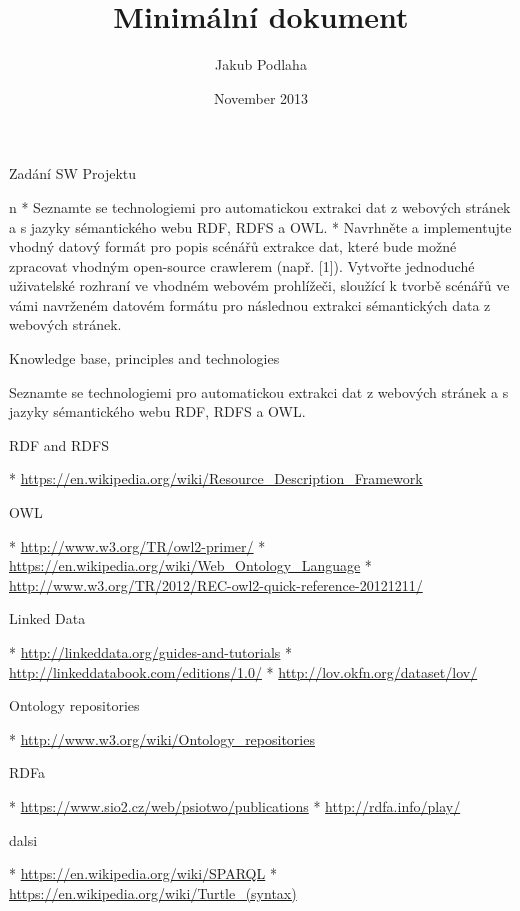 
\worktype [M/CZ]
\title {Minimální dokument}
\author {Jakub Podlaha}
\date {November 2013}
\makefront

\chap Zadání SW Projektu

\begitems \style n
  * Seznamte se technologiemi pro automatickou extrakci dat z webových stránek
    a s jazyky sémantického webu RDF, RDFS a OWL.
  * Navrhněte a implementujte vhodný datový formát pro popis scénářů extrakce
    dat, které bude možné zpracovat vhodným open-source crawlerem (např.  [1]).
    Vytvořte jednoduché uživatelské rozhraní ve vhodném webovém prohlížeči,
    sloužící k tvorbě scénářů ve vámi navrženém datovém formátu pro následnou
    extrakci sémantických data z webových stránek. 
\enditems


\chap Knowledge base, principles and technologies

Seznamte se technologiemi pro automatickou extrakci dat z webových stránek a s
jazyky sémantického webu RDF, RDFS a OWL.


\sec RDF and RDFS

\begitems
 * \url{https://en.wikipedia.org/wiki/Resource_Description_Framework}
\enditems


\sec OWL

\begitems
 * \url{http://www.w3.org/TR/owl2-primer/}
 * \url{https://en.wikipedia.org/wiki/Web_Ontology_Language}
 * \url{http://www.w3.org/TR/2012/REC-owl2-quick-reference-20121211/}
\enditems


\sec Linked Data

\begitems
 * \url{http://linkeddata.org/guides-and-tutorials}
 * \url{http://linkeddatabook.com/editions/1.0/}
 * \url{http://lov.okfn.org/dataset/lov/}
\enditems


\sec Ontology repositories

\begitems
 * \url{http://www.w3.org/wiki/Ontology_repositories}
\enditems


\sec RDFa

\begitems
 * \url{https://www.sio2.cz/web/psiotwo/publications}
 * \url{http://rdfa.info/play/}
\enditems


\sec dalsi

\begitems
 * \url{https://en.wikipedia.org/wiki/SPARQL}
 * \url{https://en.wikipedia.org/wiki/Turtle_(syntax)}
\enditems



